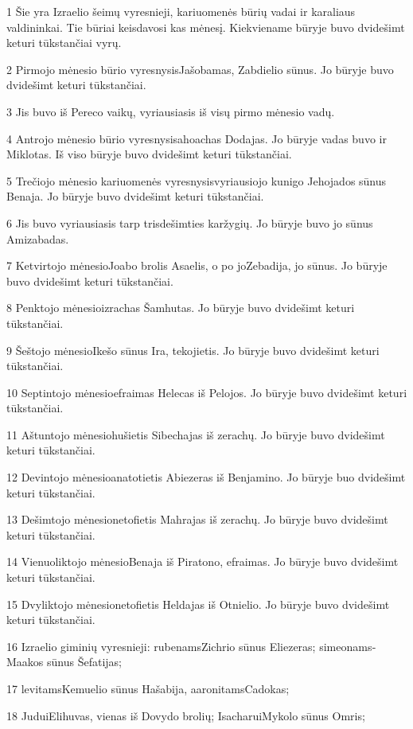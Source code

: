 \par 1 Šie yra Izraelio šeimų vyresnieji, kariuomenės būrių vadai ir karaliaus valdininkai. Tie būriai keisdavosi kas mėnesį. Kiekviename būryje buvo dvidešimt keturi tūkstančiai vyrų. 
\par 2 Pirmojo mėnesio būrio vyresnysis­Jašobamas, Zabdielio sūnus. Jo būryje buvo dvidešimt keturi tūkstančiai. 
\par 3 Jis buvo iš Pereco vaikų, vyriausiasis iš visų pirmo mėnesio vadų. 
\par 4 Antrojo mėnesio būrio vyresnysis­ahoachas Dodajas. Jo būryje vadas buvo ir Miklotas. Iš viso būryje buvo dvidešimt keturi tūkstančiai. 
\par 5 Trečiojo mėnesio kariuomenės vyresnysis­vyriausiojo kunigo Jehojados sūnus Benaja. Jo būryje buvo dvidešimt keturi tūkstančiai. 
\par 6 Jis buvo vyriausiasis tarp trisdešimties karžygių. Jo būryje buvo jo sūnus Amizabadas. 
\par 7 Ketvirtojo mėnesio­Joabo brolis Asaelis, o po jo­Zebadija, jo sūnus. Jo būryje buvo dvidešimt keturi tūkstančiai. 
\par 8 Penktojo mėnesio­izrachas Šamhutas. Jo būryje buvo dvidešimt keturi tūkstančiai. 
\par 9 Šeštojo mėnesio­Ikešo sūnus Ira, tekojietis. Jo būryje buvo dvidešimt keturi tūkstančiai. 
\par 10 Septintojo mėnesio­efraimas Helecas iš Pelojos. Jo būryje buvo dvidešimt keturi tūkstančiai. 
\par 11 Aštuntojo mėnesio­hušietis Sibechajas iš zerachų. Jo būryje buvo dvidešimt keturi tūkstančiai. 
\par 12 Devintojo mėnesio­anatotietis Abiezeras iš Benjamino. Jo būryje buo dvidešimt keturi tūkstančiai. 
\par 13 Dešimtojo mėnesio­netofietis Mahrajas iš zerachų. Jo būryje buvo dvidešimt keturi tūkstančiai. 
\par 14 Vienuoliktojo mėnesio­Benaja iš Piratono, efraimas. Jo būryje buvo dvidešimt keturi tūkstančiai. 
\par 15 Dvyliktojo mėnesio­netofietis Heldajas iš Otnielio. Jo būryje buvo dvidešimt keturi tūkstančiai. 
\par 16 Izraelio giminių vyresnieji: rubenams­Zichrio sūnus Eliezeras; simeonams­Maakos sūnus Šefatijas; 
\par 17 levitams­Kemuelio sūnus Hašabija, aaronitams­Cadokas; 
\par 18 Judui­Elihuvas, vienas iš Dovydo brolių; Isacharui­Mykolo sūnus Omris; 
